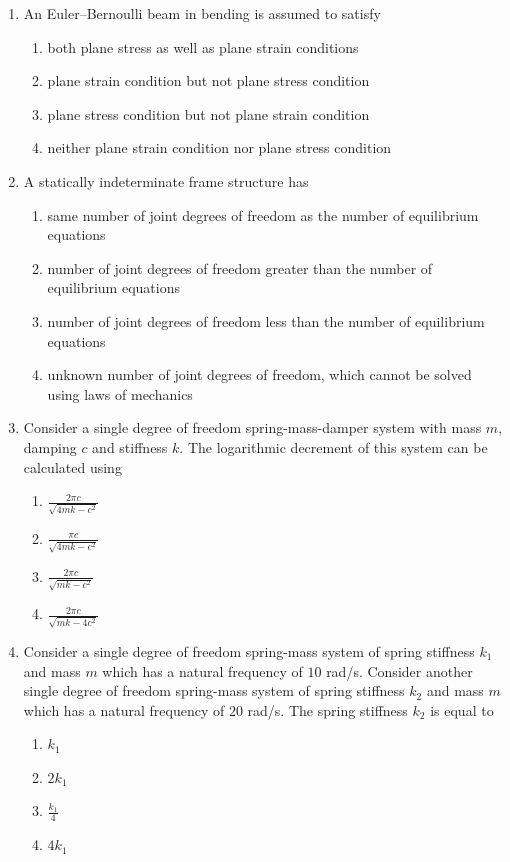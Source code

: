 \documentclass{article}
\begin{document}
\begin{enumerate}
\item An Euler–Bernoulli beam in bending is assumed to satisfy
\begin{enumerate}
\item both plane stress as well as plane strain conditions
\item plane strain condition but not plane stress condition
\item plane stress condition but not plane strain condition
\item neither plane strain condition nor plane stress condition
\end{enumerate}

\item A statically indeterminate frame structure has
\begin{enumerate}
\item same number of joint degrees of freedom as the number of equilibrium equations
\item number of joint degrees of freedom greater than the number of equilibrium equations
\item number of joint degrees of freedom less than the number of equilibrium equations
\item unknown number of joint degrees of freedom, which cannot be solved using laws of mechanics
\end{enumerate}

\item Consider a single degree of freedom spring-mass-damper system with mass $m$, damping $c$ and stiffness $k$. The logarithmic decrement of this system can be calculated using
\begin{multicols}{4}
\begin{enumerate}
\item $\frac{2\pi c}{\sqrt{4mk - c^2}}$
\item $\frac{\pi c}{\sqrt{4mk - c^2}}$
\item $\frac{2\pi c}{\sqrt{mk - c^2}}$
\item $\frac{2\pi c}{\sqrt{mk - 4c^2}}$
\end{enumerate}
\end{multicols}

\item Consider a single degree of freedom spring-mass system of spring stiffness $k_1$ and mass $m$ which has a natural frequency of $10$ rad/s. Consider another single degree of freedom spring-mass system of spring stiffness $k_2$ and mass $m$ which has a natural frequency of $20$ rad/s. The spring stiffness $k_2$ is equal to
\begin{multicols}{4}
\begin{enumerate}
\item $k_1$
\item $2k_1$
\item $\frac{k_1}{4}$
\item $4k_1$
\end{enumerate}
\end{multicols}


\end{enumerate}
\end{document}
